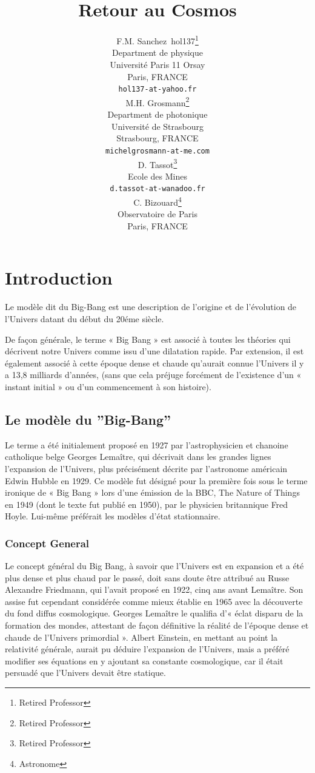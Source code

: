 \documentclass[a4paper,12pt]{article}
\title{Retour au Cosmos}
\author{
  F.M. Sanchez~hol137\thanks{Retired Professor} \\
  Department de physique\\
  Université Paris 11 Orsay \\
  Paris, FRANCE \\
  \texttt{hol137-at-yahoo.fr} \\
   \And
 M.H. Grosmann\thanks{Retired Professor} \\
  Department de photonique\\
  Université de Strasbourg\\
  Strasbourg, FRANCE \\
  \texttt{michelgrosmann-at-me.com} \\
   \And
 D. Tassot\thanks{Retired Professor} \\
  Ecole des Mines\\
  \texttt{d.tassot-at-wanadoo.fr} \\
   \And
 C. Bizouard\thanks{Astronome} \\
  Observatoire de Paris\\
  Paris, FRANCE \\
}
\begin{document}
\maketitle

\tableofcontents
\clearpage

\section*{Introduction}


Le modèle dit du Big-Bang est une description de l'origine et de l'évolution de l’Univers datant du début du 20éme siècle.

De façon générale, le terme « Big Bang » est associé à toutes les théories qui décrivent notre Univers comme issu d'une dilatation rapide. Par extension, il est également associé à cette époque dense et chaude qu’aurait connue l’Univers il y a 13,8 milliards d’années, (sans que cela préjuge forcément de l’existence d’un « instant initial » ou d’un commencement à son histoire).

\subsection{Le modèle du ”Big-Bang”}
\label{sec:headings}

Le terme a été initialement proposé en 1927 par l'astrophysicien  et chanoine catholique belge Georges Lemaître, qui décrivait dans les grandes lignes l’expansion de l'Univers, plus précisément décrite par l'astronome américain Edwin Hubble en 1929. Ce modèle fut désigné pour la première fois sous le terme ironique de « Big Bang » lors d’une émission de la BBC, The Nature of Things en 1949 (dont le texte fut publié en 1950), par le physicien britannique Fred Hoyle. Lui-même préférait les modèles d'état stationnaire.


\subsubsection{Concept General}
Le concept général du Big Bang, à savoir que l’Univers est en expansion et a été plus dense et plus chaud par le passé, doit sans doute être attribué au Russe Alexandre Friedmann, qui l'avait proposé en 1922, cinq ans avant Lemaître. Son assise fut cependant considérée comme mieux établie en 1965 avec la découverte du fond diffus cosmologique. Georges Lemaître le qualifia d’« éclat disparu de la formation des mondes, attestant de façon définitive la réalité de l’époque dense et chaude de l’Univers primordial ». Albert Einstein, en mettant au point la relativité générale, aurait pu déduire l'expansion de l'Univers, mais a préféré modifier ses équations en y ajoutant sa constante cosmologique, car il était persuadé que l'Univers devait être statique.
\end{document}
